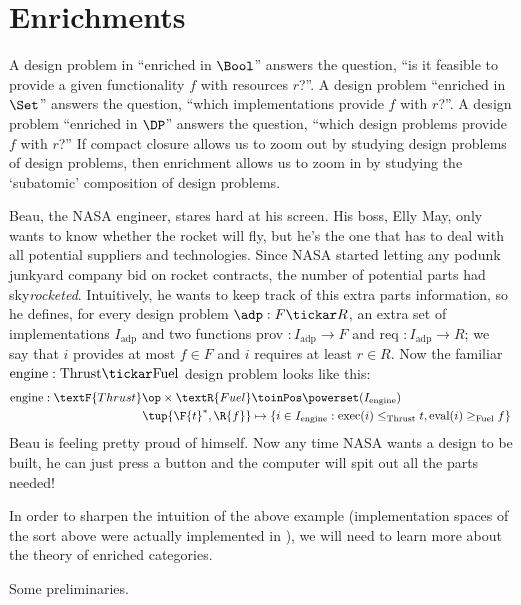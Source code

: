 \section{Enrichments}
\label{sec:enriched}
A design problem in ``enriched in $\Bool$'' answers the question, ``is it feasible to provide a given functionality $f$ with resources $r$?''.  A design problem ``enriched in $\Set$'' answers the question, ``which implementations provide $f$ with $r$?''. A design problem ``enriched in $\DP$'' answers the question, ``which design problems provide $f$ with $r$?'' If compact closure allows us to zoom out by studying design problems of design problems, then enrichment allows us to zoom in by studying the `subatomic' composition of design problems.

\begin{example}\label{ex:dpi_example}
Beau, the NASA engineer, stares hard at his screen. His boss, Elly May, only wants to know whether the rocket will fly, but he's the one that has to deal with all potential suppliers and technologies. Since NASA started letting any podunk junkyard company bid on rocket contracts, the number of potential parts had sky\emph{rocketed}. Intuitively, he wants to keep track of this extra parts information, so he defines, for every design problem $\adp : F \tickar R$, an extra set of implementations $I_\text{adp}$ and two functions prov $: I_\text{adp} \to F$ and req $: I_\text{adp} \to R$; we say that $i$ provides at most $f \in F$ and $i$ requires at least $r \in R$. Now the familiar $\text{engine} : \text{Thrust} \tickar \text{Fuel}$ design problem looks like this:
\begin{align*}
\text{engine} : \textF{Thrust}\op \times \textR{Fuel} &\toinPos \powerset(I_\text{engine}) \\
\tup{\F{t}^*,\R{f}} &\mapsto \{ i \in I_\text{engine} : \text{exec}(i) \leq_\text{Thrust} t, \text{eval}(i) \geq_\text{Fuel} f \}
\end{align*}
Beau is feeling pretty proud of himself. Now any time NASA wants a design to be built, he can just press a button and the computer will spit out all the parts needed!
\end{example}

In order to sharpen the intuition of the above example (implementation spaces of the sort above were actually implemented in \cite{censi}), we will need to learn more about the theory of enriched categories.

Some preliminaries.


